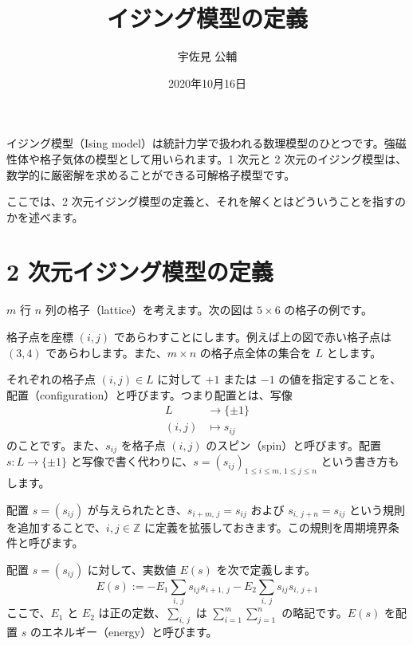 \documentclass{jlreq}
\title{イジング模型の定義}
\author{宇佐見 公輔}
\date{2020年10月16日}
\numberwithin{equation}{section}
\begin{document}
\maketitle

イジング模型（Ising model）は統計力学で扱われる数理模型のひとつです。強磁性体や格子気体の模型として用いられます。1 次元と 2 次元のイジング模型は、数学的に厳密解を求めることができる可解格子模型です。

ここでは、2 次元イジング模型の定義と、それを解くとはどういうことを指すのかを述べます。

\section*{2 次元イジング模型の定義}

$m$ 行 $n$ 列の格子（lattice）を考えます。次の図は $5 \times 6$ の格子の例です。

\begin{figure}
    
\end{figure}

格子点を座標 $(i, j)$ であらわすことにします。例えば上の図で赤い格子点は $(3, 4)$ であらわします。また、$m \times n$ の格子点全体の集合を $L$ とします。

それぞれの格子点 $(i, j) \in L$ に対して $+1$ または $-1$ の値を指定することを、配置（configuration）と呼びます。つまり配置とは、写像
\begin{equation}
    \begin{aligned}
        L      & \to     \{\pm 1\} \\
        (i, j) & \mapsto s_{ij}
    \end{aligned}
\end{equation}
のことです。また、$s_{ij}$ を格子点 $(i, j)$ のスピン（spin）と呼びます。配置 $s : L \to \{\pm 1\}$ と写像で書く代わりに、$s = (s_{ij})_{1 \leq i \leq m,\, 1 \leq j \leq n}$ という書き方もします。

配置 $s = (s_{ij})$ が与えられたとき、$s_{i+m,\,j} = s_{ij}$ および $s_{i,\,j+n} = s_{ij}$ という規則を追加することで、$i, j \in \mathbb{Z}$ に定義を拡張しておきます。この規則を周期境界条件と呼びます。

配置 $s = (s_{ij})$ に対して、実数値 $E(s)$ を次で定義します。
\begin{equation}
    E(s) := - E_1 \sum_{i,\,j} s_{ij} s_{i+1,\,j} - E_2 \sum_{i,\,j} s_{ij} s_{i,\,j+1}
\end{equation}
ここで、$E_1$ と $E_2$ は正の定数、$\displaystyle \sum_{i,\,j}$ は $\displaystyle \sum_{i=1}^m \sum_{j=1}^n$ の略記です。$E(s)$ を配置 $s$ のエネルギー（energy）と呼びます。
\end{document}
